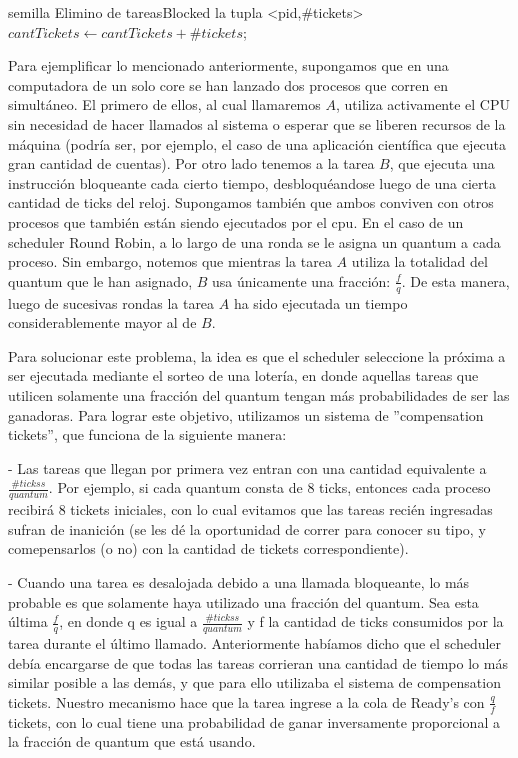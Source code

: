 \begin{algorithmic}
      \State semilla
      \State Elimino de tareasBlocked la tupla <pid,\#tickets>
      \State $cantTickets \gets cantTickets+\#tickets$;
  \EndFunction
\end{algorithmic}

Para ejemplificar lo mencionado anteriormente, supongamos que en una computadora de un solo core se han lanzado dos procesos que corren en simultáneo. El primero de ellos, al cual llamaremos $A$, utiliza
activamente el CPU sin necesidad de hacer llamados al sistema o esperar que se liberen recursos de la máquina (podría ser, por ejemplo, el caso de una aplicación científica que ejecuta gran cantidad de 
cuentas). Por otro lado tenemos a la tarea $B$, que ejecuta una instrucción bloqueante cada cierto tiempo, desbloquéandose luego de una cierta cantidad de ticks del reloj. Supongamos también que ambos conviven
con otros procesos que también están siendo ejecutados por el cpu. En el caso de un scheduler Round Robin, a lo largo de una ronda se le asigna un quantum a cada proceso. Sin embargo, notemos que mientras
la tarea $A$ utiliza la totalidad del quantum que le han asignado, $B$ usa únicamente una fracción: $\frac{f}{q}$. De esta manera, luego de sucesivas rondas la tarea $A$ ha sido ejecutada un tiempo
considerablemente mayor al de $B$.

Para solucionar este problema, la idea es que el scheduler seleccione la próxima a ser ejecutada mediante el sorteo de una lotería, en donde aquellas tareas que utilicen solamente una fracción del quantum
tengan más probabilidades de ser las ganadoras. Para lograr este objetivo, utilizamos un sistema de ''compensation tickets'', que funciona de la siguiente manera:

- Las tareas que llegan por primera vez entran con una cantidad equivalente a $\frac{\#tickss}{quantum}$. Por ejemplo, si cada quantum consta de 8 ticks, entonces cada
proceso recibirá 8 tickets iniciales, con lo cual evitamos que las tareas recién ingresadas sufran de inanición (se les dé la oportunidad de correr para conocer su tipo, 
y comepensarlos (o no) con la cantidad de tickets correspondiente).

- Cuando una tarea es desalojada debido a una llamada bloqueante, lo más probable es que solamente haya utilizado una fracción del quantum. Sea esta última $\frac{f}{q}$,
en donde q es igual a $\frac{\#tickss}{quantum}$ y f la cantidad de ticks consumidos por la tarea durante el último llamado.
Anteriormente habíamos dicho que el scheduler debía encargarse de que todas las tareas corrieran una cantidad de tiempo lo más similar posible a las demás, y que para ello utilizaba
el sistema de compensation tickets. Nuestro mecanismo hace que la tarea ingrese a la cola de Ready's con $\frac{q}{f}$ tickets, con lo cual tiene una probabilidad de ganar
inversamente proporcional a la fracción de quantum que está usando.

